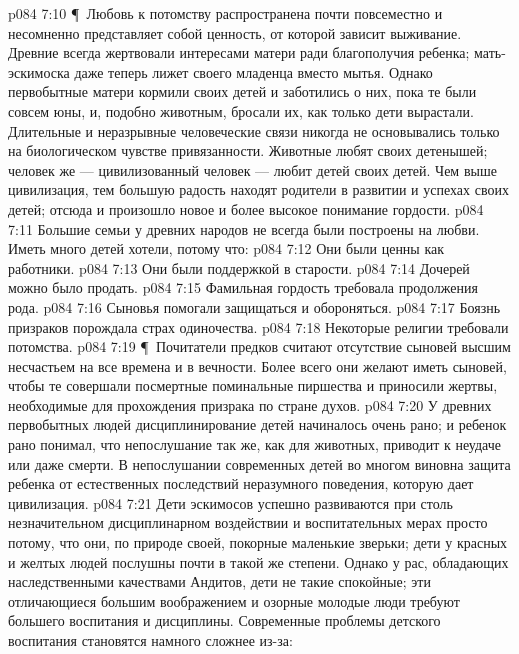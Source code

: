 \vs p084 7:10 \P\ Любовь к потомству распространена почти повсеместно и несомненно представляет собой ценность, от которой зависит выживание. Древние всегда жертвовали интересами матери ради благополучия ребенка; мать\hyp{}эскимоска даже теперь лижет своего младенца вместо мытья. Однако первобытные матери кормили своих детей и заботились о них, пока те были совсем юны, и, подобно животным, бросали их, как только дети вырастали. Длительные и неразрывные человеческие связи никогда не основывались только на биологическом чувстве привязанности. Животные любят своих детенышей; человек же --- цивилизованный человек --- любит детей своих детей. Чем выше цивилизация, тем большую радость находят родители в развитии и успехах своих детей; отсюда и произошло новое и более высокое понимание  гордости.
\vs p084 7:11 Большие семьи у древних народов не всегда были построены на любви. Иметь много детей хотели, потому что:
\vs p084 7:12 \bibnobreakspace Они были ценны как работники.
\vs p084 7:13 \bibnobreakspace Они были поддержкой в старости.
\vs p084 7:14 \bibnobreakspace Дочерей можно было продать.
\vs p084 7:15 \bibnobreakspace Фамильная гордость требовала продолжения рода.
\vs p084 7:16 \bibnobreakspace Сыновья помогали защищаться и обороняться.
\vs p084 7:17 \bibnobreakspace Боязнь призраков порождала страх одиночества.
\vs p084 7:18 \bibnobreakspace Некоторые религии требовали потомства.
\vs p084 7:19 \P\ Почитатели предков считают отсутствие сыновей высшим несчастьем на все времена и в вечности. Более всего они желают иметь сыновей, чтобы те совершали посмертные поминальные пиршества и приносили жертвы, необходимые для прохождения призрака по стране духов.
\vs p084 7:20 У древних первобытных людей дисциплинирование детей начиналось очень рано; и ребенок рано понимал, что непослушание так же, как для животных, приводит к неудаче или даже смерти. В непослушании современных детей во многом виновна защита ребенка от естественных последствий неразумного поведения, которую дает цивилизация.
\vs p084 7:21 Дети эскимосов успешно развиваются при столь незначительном дисциплинарном воздействии и воспитательных мерах просто потому, что они, по природе своей, покорные маленькие зверьки; дети у красных и желтых людей послушны почти в такой же степени. Однако у рас, обладающих наследственными качествами Андитов, дети не такие спокойные; эти отличающиеся большим воображением и озорные молодые люди требуют большего воспитания и дисциплины. Современные проблемы детского воспитания становятся намного сложнее из\hyp{}за:
